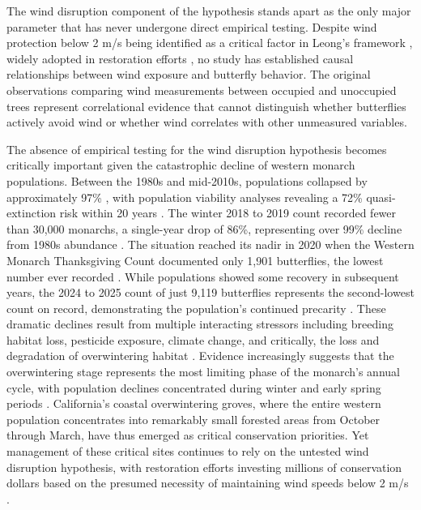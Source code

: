 The wind disruption component of the hypothesis stands apart as the only major parameter that has never undergone direct empirical testing. Despite wind protection below 2 m/s being identified as a critical factor in Leong's framework \citep{leongEvaluationManagementCalifornia2016}, widely adopted in restoration efforts \citep{xercessocietyManagingMonarchsWest2018}, no study has established causal relationships between wind exposure and butterfly behavior. The original observations comparing wind measurements between occupied and unoccupied trees represent correlational evidence that cannot distinguish whether butterflies actively avoid wind or whether wind correlates with other unmeasured variables.

The absence of empirical testing for the wind disruption hypothesis becomes critically important given the catastrophic decline of western monarch populations. Between the 1980s and mid-2010s, populations collapsed by approximately 97\% \citep{schultzCitizenScienceMonitoring2017}, with population viability analyses revealing a 72\% quasi-extinction risk within 20 years \citep{schultzCitizenScienceMonitoring2017}. The winter 2018 to 2019 count recorded fewer than 30,000 monarchs, a single-year drop of 86\%, representing over 99\% decline from 1980s abundance \citep{peltonWesternMonarchPopulation2019}. The situation reached its nadir in 2020 when the Western Monarch Thanksgiving Count documented only 1,901 butterflies, the lowest number ever recorded \citep{xercessocietyWesternMonarchThanksgiving2025}. While populations showed some recovery in subsequent years, the 2024 to 2025 count of just 9,119 butterflies represents the second-lowest count on record, demonstrating the population's continued precarity \citep{xercessocietyWesternMonarchThanksgiving2025}. These dramatic declines result from multiple interacting stressors including breeding habitat loss, pesticide exposure, climate change, and critically, the loss and degradation of overwintering habitat \citep{croneWhyAreMonarch2019,peltonWesternMonarchPopulation2019}. Evidence increasingly suggests that the overwintering stage represents the most limiting phase of the monarch's annual cycle, with population declines concentrated during winter and early spring periods \citep{peltonWesternMonarchPopulation2019}. California's coastal overwintering groves, where the entire western population concentrates into remarkably small forested areas from October through March, have thus emerged as critical conservation priorities. Yet management of these critical sites continues to rely on the untested wind disruption hypothesis, with restoration efforts investing millions of conservation dollars based on the presumed necessity of maintaining wind speeds below 2 m/s \citep{althouse&meadeinc.EllwoodMesaSperling2023,xercessocietyManagingMonarchsWest2018,peltonMonarchButterflyOverwintering2020,jepsenProtectingCaliforniasButterfly2017,weissAlbanyHillMonarch2018}.

